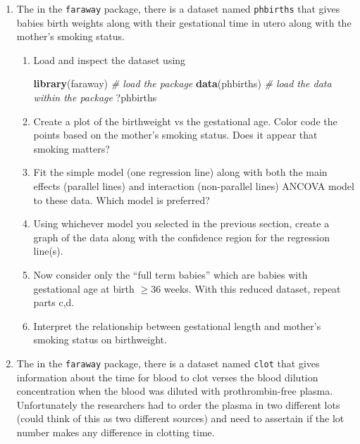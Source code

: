 \documentclass[]{book}
\newenvironment{Shaded}{\begin{snugshade}}{\end{snugshade}}
\newcommand{\KeywordTok}[1]{\textcolor[rgb]{0.13,0.29,0.53}{\textbf{{#1}}}}
\newcommand{\CommentTok}[1]{\textcolor[rgb]{0.56,0.35,0.01}{\textit{{#1}}}}
\newcommand{\NormalTok}[1]{{#1}}
\providecommand{\tightlist}{%
  \setlength{\itemsep}{0pt}\setlength{\parskip}{0pt}}
\theoremstyle{definition}
\theoremstyle{definition}
\theoremstyle{remark}
\begin{document}
\begin{enumerate}
\def\labelenumi{\arabic{enumi}.}
\tightlist
\item
  The in the \texttt{faraway} package, there is a dataset named
  \texttt{phbirths} that gives babies birth weights along with their
  gestational time in utero along with the mother's smoking status.

  \begin{enumerate}
  \def\labelenumii{\alph{enumii}.}
  \item
    Load and inspect the dataset using

\begin{Shaded}
\begin{Highlighting}[]
\KeywordTok{library}\NormalTok{(faraway)    }\CommentTok{# load the package}
\KeywordTok{data}\NormalTok{(phbirths)      }\CommentTok{# load the data within the package}
\NormalTok{?phbirths}
\end{Highlighting}
\end{Shaded}
  \item
    Create a plot of the birthweight vs the gestational age. Color code
    the points based on the mother's smoking status. Does it appear that
    smoking matters?
  \item
    Fit the simple model (one regression line) along with both the main
    effects (parallel lines) and interaction (non-parallel lines) ANCOVA
    model to these data. Which model is preferred?
  \item
    Using whichever model you selected in the previous section, create a
    graph of the data along with the confidence region for the
    regression line(s).
  \item
    Now consider only the ``full term babies'' which are babies with
    gestational age at birth \(\ge 36\) weeks. With this reduced
    dataset, repeat parts c,d.
  \item
    Interpret the relationship between gestational length and mother's
    smoking status on birthweight.
  \end{enumerate}
\item
  The in the \texttt{faraway} package, there is a dataset named
  \texttt{clot} that gives information about the time for blood to clot
  verses the blood dilution concentration when the blood was diluted
  with prothrombin-free plasma. Unfortunately the researchers had to
  order the plasma in two different lots (could think of this as two
  different sources) and need to assertain if the lot number makes any
  difference in clotting time.


\end{enumerate}
\end{document}
